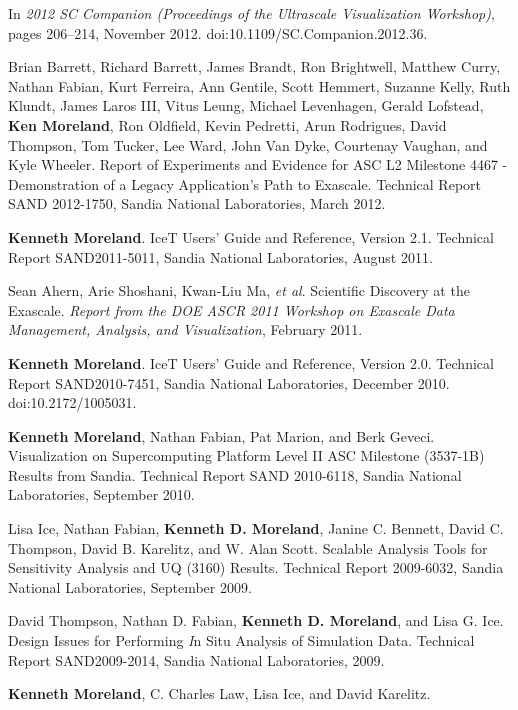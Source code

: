 \begin{enumerate}[label={[\arabic*]}, left=0pt]
  In \emph{2012 SC Companion (Proceedings of the Ultrascale Visualization Workshop)}, pages 206--214, November 2012.
  doi:10.1109/SC.Companion.2012.36.
\item  %
  Brian Barrett, Richard Barrett, James Brandt, Ron Brightwell, Matthew Curry, Nathan Fabian, Kurt Ferreira, Ann Gentile, Scott Hemmert, Suzanne Kelly, Ruth Klundt, James Laros III, Vitus Leung, Michael Levenhagen, Gerald Lofstead, \textbf{Ken Moreland}, Ron Oldfield, Kevin Pedretti, Arun Rodrigues, David Thompson, Tom Tucker, Lee Ward, John Van Dyke, Courtenay Vaughan, and Kyle Wheeler.
  Report of Experiments and Evidence for ASC L2 Milestone 4467 - Demonstration of a Legacy Application’s Path to Exascale.
Technical Report SAND 2012-1750, Sandia National Laboratories, March 2012.
\item  %
  \textbf{Kenneth Moreland}.
  {IceT} Users' Guide and Reference, Version 2.1.
Technical Report SAND2011-5011, Sandia National Laboratories, August 2011.
\item  %
  Sean Ahern, Arie Shoshani, Kwan-Liu Ma, \emph{et al}.
  Scientific Discovery at the Exascale.
\emph{Report from the DOE ASCR 2011 Workshop on Exascale Data Management, Analysis, and Visualization}, February 2011.
\item  %
  \textbf{Kenneth Moreland}.
  IceT Users’ Guide and Reference, Version 2.0.
Technical Report SAND2010-7451, Sandia National Laboratories, December 2010.
  doi:10.2172/1005031.
\item  %
  \textbf{Kenneth Moreland}, Nathan Fabian, Pat Marion, and Berk Geveci.
  Visualization on Supercomputing Platform Level {II} {ASC} Milestone {(3537-1B)} Results from {Sandia}.
Technical Report SAND 2010-6118, Sandia National Laboratories, September 2010.
\item  %
  Lisa Ice, Nathan Fabian, \textbf{Kenneth D. Moreland}, Janine C. Bennett, David C. Thompson, David B. Karelitz, and W. Alan Scott.
  Scalable Analysis Tools for Sensitivity Analysis and {UQ} (3160) Results.
Technical Report 2009-6032, Sandia National Laboratories, September 2009.
\item  %
  David Thompson, Nathan D. Fabian, \textbf{Kenneth D. Moreland}, and Lisa G. Ice.
  Design Issues for Performing {\textit In Situ} Analysis of Simulation Data.
Technical Report SAND2009-2014, Sandia National Laboratories, 2009.
\item  %
  \textbf{Kenneth Moreland}, C. Charles Law, Lisa Ice, and David Karelitz.

\end{enumerate}
